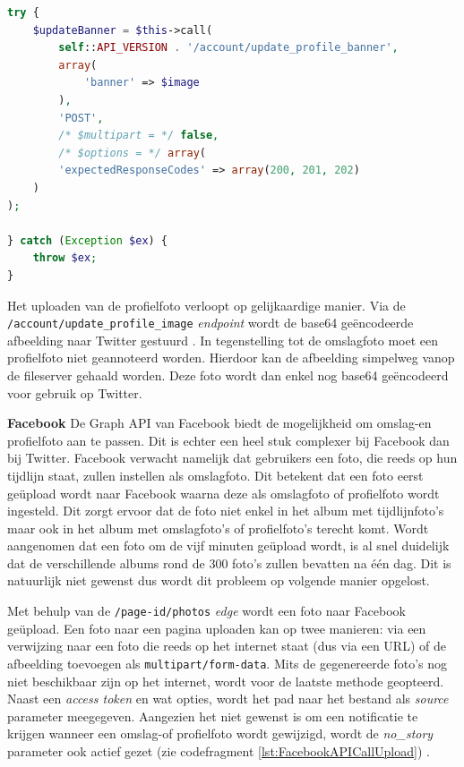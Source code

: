 \begin{lstlisting}[caption={Uploaden van omslagfoto naar Twitter},label=lst:TwitterAPICall,language=PHP]
try {
	$updateBanner = $this->call(
		self::API_VERSION . '/account/update_profile_banner',
		array(
			'banner' => $image
		),
		'POST',
    	/* $multipart = */ false,
		/* $options = */ array(
		'expectedResponseCodes' => array(200, 201, 202)
	)
);

} catch (Exception $ex) {
	throw $ex;
}
\end{lstlisting}

Het uploaden van de profielfoto verloopt op gelijkaardige manier. Via de \texttt{/account/update{\_}profile{\_}image} \textit{endpoint} wordt de base64 ge\"{e}ncodeerde afbeelding naar Twitter gestuurd \cite{TwitterAPIDoc}. In tegenstelling tot de omslagfoto moet een profielfoto niet geannoteerd worden. Hierdoor kan de afbeelding simpelweg vanop de fileserver gehaald worden. Deze foto wordt dan enkel nog base64 ge\"{e}ncodeerd voor gebruik op Twitter.

\textbf{Facebook} \break
De Graph API van Facebook biedt de mogelijkheid om omslag-en profielfoto aan te passen. Dit is echter een heel stuk complexer bij Facebook dan bij Twitter. %
Facebook verwacht namelijk dat gebruikers een foto, die reeds op hun tijdlijn staat, zullen instellen als omslagfoto. Dit betekent dat een foto eerst ge\"{u}pload wordt naar Facebook waarna deze als omslagfoto of profielfoto wordt ingesteld. Dit zorgt ervoor dat de foto niet enkel in het album met tijdlijnfoto's maar ook in het album met omslagfoto's of profielfoto's terecht komt. Wordt aangenomen dat een foto om de vijf minuten ge\"{u}pload wordt, is al snel duidelijk dat de verschillende albums rond de 300 foto's zullen bevatten na \'{e}\'{e}n dag. Dit is natuurlijk niet gewenst dus wordt dit probleem op volgende manier opgelost. %

Met behulp van de \texttt{/page-id/photos} \textit{edge} wordt een foto naar Facebook ge\"{u}pload. Een foto naar een pagina uploaden kan op twee manieren: via een verwijzing naar een foto die reeds op het internet staat (dus via een URL) of de afbeelding toevoegen als \texttt{multipart/form-data}. Mits de gegenereerde foto's nog niet beschikbaar zijn op het internet, wordt voor de laatste methode geopteerd. Naast een \textit{access token} en wat opties, wordt het pad naar het bestand als \textit{source} parameter meegegeven. Aangezien het niet gewenst is om een notificatie te krijgen wanneer een omslag-of profielfoto wordt gewijzigd, wordt de \textit{no{\_}story} parameter ook actief gezet (zie codefragment \ref{lst:FacebookAPICallUpload}) \cite{FacebookPagePhotos}. 

